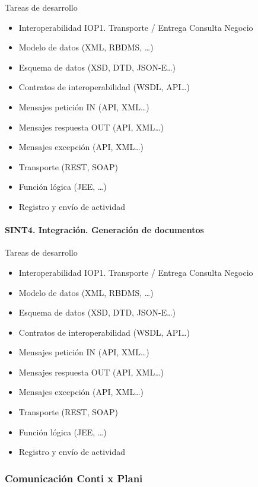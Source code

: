 \documentclass[
  paper=a4,
  ,captions=tableheading
]{scrartcl}
\providecommand{\tightlist}{%
  \setlength{\itemsep}{0pt}\setlength{\parskip}{0pt}}
\begin{document}
Tareas de desarrollo

\begin{itemize}
\tightlist
\item
  Interoperabilidad IOP1. Transporte / Entrega Consulta Negocio
\item
  Modelo de datos (XML, RBDMS, \ldots)
\item
  Esquema de datos (XSD, DTD, JSON-E\ldots)
\item
  Contratos de interoperabilidad (WSDL, API\ldots)
\item
  Mensajes petición IN (API, XML\ldots)
\item
  Mensajes respuesta OUT (API, XML\ldots)
\item
  Mensajes excepción (API, XML\ldots)
\item
  Transporte (REST, SOAP)
\item
  Función lógica (JEE, \ldots)
\item
  Registro y envío de actividad
\end{itemize}

\paragraph{SINT4. Integración. Generación de
documentos}\label{sec:sint4.-integraciuxf3n.-generaciuxf3n-de-documentos}

Tareas de desarrollo

\begin{itemize}
\tightlist
\item
  Interoperabilidad IOP1. Transporte / Entrega Consulta Negocio
\item
  Modelo de datos (XML, RBDMS, \ldots)
\item
  Esquema de datos (XSD, DTD, JSON-E\ldots)
\item
  Contratos de interoperabilidad (WSDL, API\ldots)
\item
  Mensajes petición IN (API, XML\ldots)
\item
  Mensajes respuesta OUT (API, XML\ldots)
\item
  Mensajes excepción (API, XML\ldots)
\item
  Transporte (REST, SOAP)
\item
  Función lógica (JEE, \ldots)
\item
  Registro y envío de actividad
\end{itemize}

\subsubsection{Comunicación Conti x
Plani}\label{sec:comunicaciuxf3n-conti-x-plani}
\end{document}
